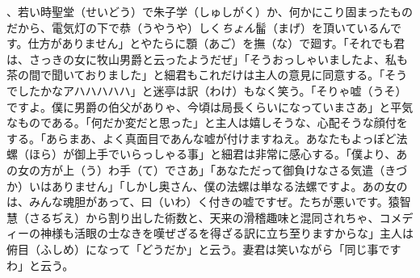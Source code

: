 \documentclass{book}
\begin{document}
、若い時聖堂（せいどう）で朱子学（しゅしがく）か、何かにこり固まったものだから、電気灯の下で恭（うやうや）しく\emph{ちょん}髷（まげ）を頂いているんです。仕方がありません」とやたらに顋（あご）を撫（な）で廻す。「それでも君は、さっきの女に牧山男爵と云ったようだぜ」「そうおっしゃいましたよ、私も茶の間で聞いておりました」と細君もこれだけは主人の意見に同意する。「そうでしたかなアハハハハハ」と迷亭は訳（わけ）もなく笑う。「そりゃ嘘（うそ）ですよ。僕に男爵の伯父がありゃ、今頃は局長くらいになっていまさあ」と平気なものである。「何だか変だと思った」と主人は嬉しそうな、心配そうな顔付をする。「あらまあ、よく真面目であんな嘘が付けますねえ。あなたもよっぽど法螺（ほら）が御上手でいらっしゃる事」と細君は非常に感心する。「僕より、あの女の方が上（う）わ手（て）でさあ」「あなただって御負けなさる気遣（きづか）いはありません」「しかし奥さん、僕の法螺は単なる法螺ですよ。あの女のは、みんな魂胆があって、曰（いわ）く付きの嘘ですぜ。たちが悪いです。猿智慧（さるぢえ）から割り出した術数と、天来の滑稽趣味と混同されちゃ、コメディーの神様も活眼の士なきを嘆ぜざるを得ざる訳に立ち至りますからな」主人は俯目（ふしめ）になって「どうだか」と云う。妻君は笑いながら「同じ事ですわ」と云う。\\
\end{document}
